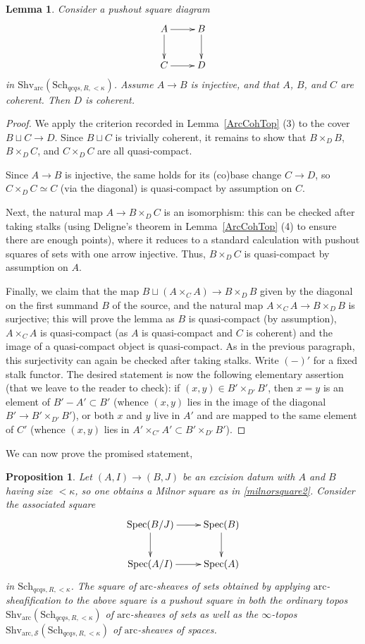 \documentclass[reqno]{amsart}
\newcommand{\spec}{\mathrm{Spec}}
\newcommand{\arc}{\mathrm{arc}}
\newtheorem{proposition}[theorem]{Proposition}
\newtheorem{lemma}[theorem]{Lemma}
\theoremstyle{definition}
\begin{document}
\begin{lemma}
\label{PushoutCritCoh}
Consider a pushout square diagram
\[ \xymatrix{ A \ar[r] \ar[d] & B \ar[d] \\ C \ar[r] & D }\]
in $\mathrm{Shv}_{\arc}(\mathrm{Sch}_{qcqs,R,<\kappa})$. Assume $A \to B$ is injective, and that $A$, $B$, and $C$ are coherent. Then $D$ is coherent.
\end{lemma}
\begin{proof}
We apply the criterion recorded in Lemma~\ref{ArcCohTop} (3) to the cover $B \sqcup C \to D$. Since $B \sqcup C$ is trivially coherent, it remains to show that $B \times_D B$, $B \times_D C$, and $C \times_D C$ are all quasi-compact. 

Since $A \to B$ is injective, the same holds for its (co)base change $C \to D$, so $C \times_D C \simeq C$ (via the diagonal) is quasi-compact by assumption on $C$.

Next, the natural map $A \to B \times_D C$ is an isomorphism: this can be checked after taking stalks (using Deligne's theorem in Lemma~\ref{ArcCohTop} (4) to ensure there are enough points), where it reduces to a standard calculation with pushout squares of sets with one arrow injective. Thus, $B \times_D C$ is quasi-compact by assumption on $A$. 

Finally, we claim that the  map $B \sqcup (A \times_C A) \to B \times_D B$ given by the diagonal on the first summand $B$ of the source, and the natural map $A \times_C A \to B \times_D B$ is surjective; this will prove the lemma as $B$ is quasi-compact (by assumption), $A \times_C A$ is quasi-compact (as $A$ is quasi-compact and $C$ is coherent) and the image of a quasi-compact object is quasi-compact. As in the previous paragraph, this surjectivity can again be checked after taking stalks. Write $(-)'$ for a fixed stalk functor. The desired statement is now the following elementary assertion (that we leave to the reader to check): if $(x,y) \in B' \times_{D'} B'$, then $x=y$ is an element of $B' - A' \subset B'$ (whence $(x,y)$ lies in the image of the diagonal $B' \to B' \times_{D'} B'$), or both $x$ and $y$ live in $A'$ and are mapped to the same element of $C'$ (whence $(x,y)$ lies in $A' \times_{C'} A' \subset B' \times_{D'} B'$).
\end{proof}


We can now prove the promised statement,

\begin{proposition}
\label{ExcSquarePushout}
Let $(A,I) \to (B,J)$ be an excision datum with $A$ and $B$ having size
$<\kappa$, so one obtains a Milnor square as in \eqref{milnorsquare2}. Consider the associated square
\[ \xymatrix{ \spec(B/J) \ar[r] \ar[d] & \spec(B) \ar[d] \\
		  \spec(A/I) \ar[r] & \spec(A)}\]
in $\mathrm{Sch}_{qcqs,R, <\kappa}$. The square of $\arc$-sheaves of sets
obtained by applying $\arc$-sheafification to the above square is a pushout
square in both  the ordinary topos $\mathrm{Shv}_{\arc}(\mathrm{Sch}_{qcqs,R, <
\kappa})$ of $\arc$-sheaves of sets as well as the $\infty$-topos
$\mathrm{Shv}_{\arc,\mathcal{S}}(\mathrm{Sch}_{qcqs,R, < \kappa})$ of $\arc$-sheaves of spaces.
\end{proposition}
\end{document}
